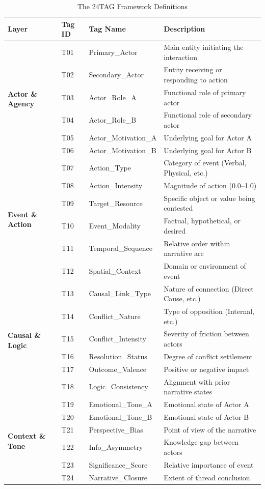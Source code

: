 \documentclass[11pt,a4paper]{article}
\begin{document}
\begin{table}[h!]
\centering
\caption{The 24TAG Framework Definitions}
\small
\begin{tabular}{llll}
\toprule
\textbf{Layer} & \textbf{Tag ID} & \textbf{Tag Name} & \textbf{Description} \\
\midrule
\multirow{6}{*}{\textbf{Actor \& Agency}}
  & T01 & Primary\_Actor      & Main entity initiating the interaction \\
  & T02 & Secondary\_Actor    & Entity receiving or responding to action \\
  & T03 & Actor\_Role\_A      & Functional role of primary actor \\
  & T04 & Actor\_Role\_B      & Functional role of secondary actor \\
  & T05 & Actor\_Motivation\_A & Underlying goal for Actor A \\
  & T06 & Actor\_Motivation\_B & Underlying goal for Actor B \\
\midrule
\multirow{6}{*}{\textbf{Event \& Action}}
  & T07 & Action\_Type        & Category of event (Verbal, Physical, etc.) \\
  & T08 & Action\_Intensity   & Magnitude of action (0.0--1.0) \\
  & T09 & Target\_Resource    & Specific object or value being contested \\
  & T10 & Event\_Modality     & Factual, hypothetical, or desired \\
  & T11 & Temporal\_Sequence  & Relative order within narrative arc \\
  & T12 & Spatial\_Context    & Domain or environment of event \\
\midrule
\multirow{6}{*}{\textbf{Causal \& Logic}}
  & T13 & Causal\_Link\_Type  & Nature of connection (Direct Cause, etc.) \\
  & T14 & Conflict\_Nature    & Type of opposition (Internal, etc.) \\
  & T15 & Conflict\_Intensity & Severity of friction between actors \\
  & T16 & Resolution\_Status  & Degree of conflict settlement \\
  & T17 & Outcome\_Valence    & Positive or negative impact \\
  & T18 & Logic\_Consistency  & Alignment with prior narrative states \\
\midrule
\multirow{6}{*}{\textbf{Context \& Tone}}
  & T19 & Emotional\_Tone\_A  & Emotional state of Actor A \\
  & T20 & Emotional\_Tone\_B  & Emotional state of Actor B \\
  & T21 & Perspective\_Bias   & Point of view of the narrative \\
  & T22 & Info\_Asymmetry     & Knowledge gap between actors \\
  & T23 & Significance\_Score & Relative importance of event \\
  & T24 & Narrative\_Closure  & Extent of thread conclusion \\
\bottomrule
\end{tabular}
\end{table}
\end{document}
